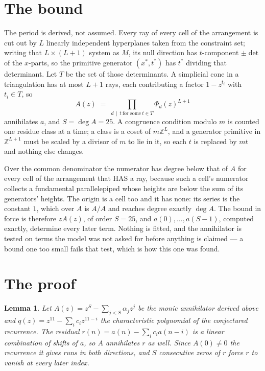 \documentclass[11pt,a4paper]{article}
\theoremstyle{plain}
\newtheorem{lemma}[theorem]{Lemma}
\theoremstyle{definition}
\begin{document}
\section{The bound}

The period is derived, not assumed. Every ray of every cell of the arrangement is cut out by
$L$ linearly independent hyperplanes taken from the constraint set; writing that $L\times(L+1)$
system as $M$, its null direction has $t$-component $\pm\det$ of the $x$-parts, so the
primitive generator $(x^*,t^*)$ has $t^*$ dividing that determinant. Let $T$ be the set of
those determinants. A simplicial cone in a triangulation has at most $L+1$ rays, each
contributing a factor $1-z^{t_i}$ with $t_i\in T$, so
\[
A(z)\;=\;\prod_{d\,\mid\,t\ \text{for some}\ t\in T}\Phi_d(z)^{L+1}
\]
annihilates $a$, and $S=\deg A=25$. A congruence condition modulo $m$ is counted one residue
class at a time; a class is a coset of $m\mathbb{Z}^L$, and a generator primitive in
$\mathbb{Z}^{L+1}$ must be scaled by a divisor of $m$ to lie in it, so each $t$ is replaced
by $mt$ and nothing else changes.

Over the common denominator the numerator has degree below that of $A$ for every cell of the
arrangement that HAS a ray, because such a cell's numerator collects a fundamental
parallelepiped whose heights are below the sum of its generators' heights. The origin is a cell
too and it has none: its series is the constant $1$, which over $A$ is $A/A$ and reaches degree
exactly $\deg A$. The bound in force is therefore $zA(z)$, of order $S=25$, and
$a(0),\dots,a(S-1)$, computed exactly, determine every later term. Nothing is fitted, and the
annihilator is tested on terms the model was not asked for before anything is claimed --- a
bound one too small fails that test, which is how this one was found.

\section{The proof}

\begin{lemma}\label{lem:crit}
Let $A(z)=z^S-\sum_{j<S}\alpha_jz^{j}$ be the monic annihilator derived above and
$q(z)=z^{11}-\sum_ic_iz^{11-i}$ the characteristic polynomial of the conjectured
recurrence. The residual $r(n)=a(n)-\sum_ic_ia(n-i)$ is a linear combination of shifts of $a$,
so $A$ annihilates $r$ as well. Since $A(0)\ne0$ the recurrence it gives runs in both
directions, and $S$ consecutive zeros of $r$ force $r$ to vanish at every later index.
\end{lemma}
\end{document}
